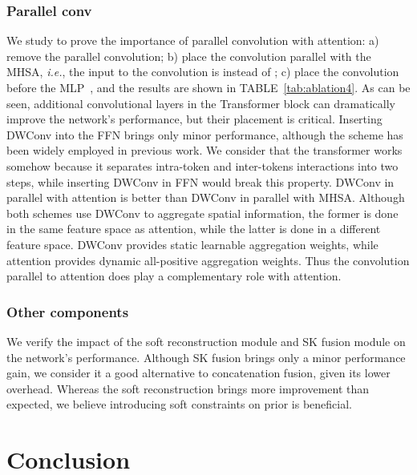 \documentclass[journal]{IEEEtran}
\begin{document}
\subsubsection{Parallel conv}
We study to prove the importance of parallel convolution with attention: a) remove the parallel convolution; b) place the convolution parallel with the MHSA, \emph{i.e.}, the input to the convolution is  instead of ; c) place the convolution before the MLP~\cite{liu2022convnet}, and the results are shown in TABLE~\ref{tab:ablation4}.
As can be seen, additional convolutional layers in the Transformer block can dramatically improve the network's performance, but their placement is critical.
Inserting DWConv into the FFN brings only minor performance, although the scheme has been widely employed in previous work.
We consider that the transformer works somehow because it separates intra-token and inter-tokens interactions into two steps, while inserting DWConv in FFN would break this property.
DWConv in parallel with attention is better than DWConv in parallel with MHSA.
Although both schemes use DWConv to aggregate spatial information, the former is done in the same feature space as attention, while the latter is done in a different feature space.
DWConv provides static learnable aggregation weights, while attention provides dynamic all-positive aggregation weights.
Thus the convolution parallel to attention does play a complementary role with attention.

\subsubsection{Other components}

We verify the impact of the soft reconstruction module and SK fusion module on the network's performance.
Although SK fusion brings only a minor performance gain, we consider it a good alternative to concatenation fusion, given its lower overhead.
Whereas the soft reconstruction brings more improvement than expected, we believe introducing soft constraints on prior is beneficial.
 \section{Conclusion}
\end{document}
